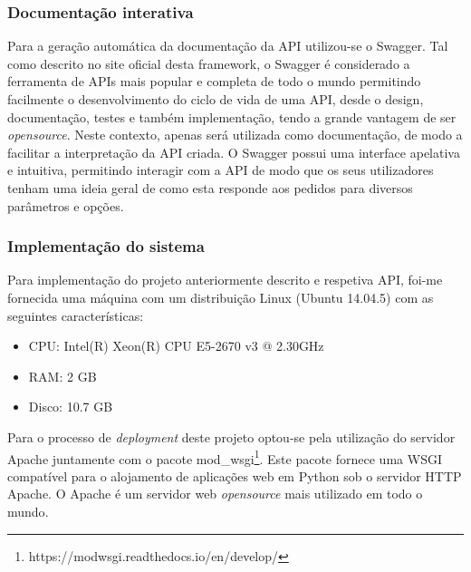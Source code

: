 \subsubsection{Documentação interativa}


Para a geração automática da documentação da API utilizou-se o Swagger. Tal como descrito no site oficial desta framework\cite{SmartBearSoftware2017}, o Swagger é considerado a ferramenta de APIs mais popular e completa de todo o mundo permitindo facilmente o desenvolvimento do ciclo de vida de uma \ac{API}, desde o design, documentação, testes e também implementação, tendo a grande vantagem de ser \textit{opensource}. Neste contexto, apenas será utilizada como documentação, de modo a facilitar a interpretação da \ac{API} criada. O Swagger possui uma interface apelativa e intuitiva, permitindo interagir com a \ac{API} de modo que os seus utilizadores tenham uma ideia geral de como esta responde aos pedidos para diversos parâmetros e opções. 





\subsubsection{Implementação do sistema}

Para implementação do projeto anteriormente descrito e respetiva API, foi-me fornecida uma máquina com um distribuição Linux (Ubuntu 14.04.5) com as seguintes características: 

\begin{itemize}
	\item \ac{CPU}: Intel(R) Xeon(R) CPU E5-2670 v3 @ 2.30GHz
	\item \ac{RAM}: 2 GB
	\item Disco: 10.7 GB
\end{itemize}


Para o processo de \textit{deployment} deste projeto optou-se pela utilização do servidor Apache juntamente com o pacote mod\_wsgi\footnote{https://modwsgi.readthedocs.io/en/develop/}. 
Este pacote fornece uma \ac{WSGI} compatível para o alojamento de aplicações web em Python sob o servidor \ac{HTTP} Apache. O Apache é um servidor web \textit{opensource} mais utilizado em todo o mundo\cite{TheApacheSoftwareFoundation2016}.












